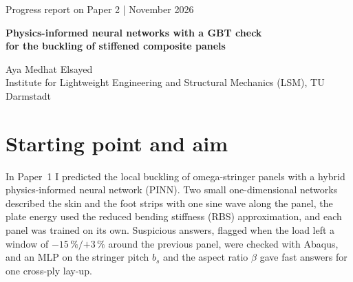 \documentclass[11pt,a4paper]{article}
\newcommand{\pc}{\,\%}
\begin{document}
\begin{center}
{\small\color{muted}Progress report on Paper 2 \quad| November 2026}\\[10pt]
{\LARGE\bfseries\color{ink} Physics-informed neural networks with a GBT check\\[2pt] for the buckling of stiffened composite panels\par}
\vspace{10pt}
{\large Aya Medhat Elsayed}\\[2pt]{\small\color{muted}Institute for Lightweight Engineering and Structural Mechanics (LSM), TU Darmstadt}
\end{center}

\vspace{4pt}
\begin{abstract}
\noindent This report follows the machine-learning work on the second paper of my project, from the first physics-informed network on 22 October to the cost study of 23 November 2026, including every attempt that did not work. The physics is our periodic Generalized Beam Theory (GBT) code, which replaces the plate model and the Abaqus oracle of Paper~1. I built a shared reduced space in which every design has the same coordinates, found that a physics-only network trains only after its numerical conditioning is fixed, compared physics, data and hybrid losses, tried one network for all lay-ups and split it into lay-up experts, and finally compared the network honestly with simple alternatives. The network's modes start a block eigen-iteration whose relative residual gives a label-free error estimate. With 120 labels, the instant answer of the network is 0.24--1.18\pc{} from full GBT on average and at most 4.92\pc{} on 320 unseen designs; the error estimate was never below the true error in 3800 checks, and a 5\pc{} target is met on every design without labels. The network adds less than I expected; the main contribution is the residual-based GBT check.
\end{abstract}

\section{Starting point and aim}

In Paper~1 \cite{p1} I predicted the local buckling of omega-stringer panels with a hybrid physics-informed neural network (PINN). Two small one-dimensional networks described the skin and the foot strips with one sine wave along the panel, the plate energy used the reduced bending stiffness (RBS) approximation, and each panel was trained on its own. Suspicious answers, flagged when the load left a window of $-15\pc{}/{+3}\pc{}$ around the previous panel, were checked with Abaqus, and an MLP on the stringer pitch $b_s$ and the aspect ratio $\beta$ gave fast answers for one cross-ply lay-up.
\end{document}
